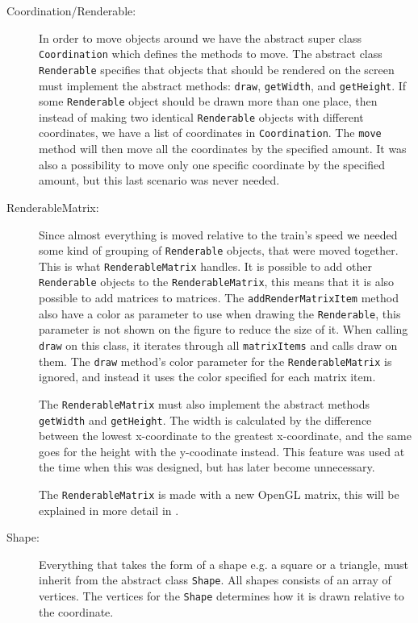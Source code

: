 \begin{description}
\item[Coordination/Renderable:] In order to move objects around we have the abstract super class \lstinline|Coordination| which defines the methods to move. The abstract class \lstinline|Renderable| specifies that objects that should be rendered on the screen must implement the abstract methods: \lstinline|draw|, \lstinline|getWidth|, and \lstinline|getHeight|. If some \lstinline|Renderable| object should be drawn more than one place, then instead of making two identical \lstinline|Renderable| objects with different coordinates, we have a list of coordinates in \lstinline|Coordination|. The \lstinline|move| method will then move all the coordinates by the specified amount. It was also a possibility to move only one specific coordinate by the specified amount, but this last scenario was never needed.

\item[RenderableMatrix:] Since almost everything is moved relative to the train's speed we needed some kind of grouping of \lstinline|Renderable| objects, that were moved together. This is what \lstinline|RenderableMatrix| handles. It is possible to add other \lstinline|Renderable| objects to the \lstinline|RenderableMatrix|, this means that it is also possible to add matrices to matrices. The \lstinline|addRenderMatrixItem| method also have a color as parameter to use when drawing the \lstinline|Renderable|, this parameter is not shown on the figure to reduce the size of it. When calling \lstinline|draw| on this class, it iterates through all \lstinline|matrixItems| and calls draw on them. The \lstinline|draw| method's color parameter for the \lstinline|RenderableMatrix| is ignored, and instead it uses the color specified for each matrix item.

The \lstinline|RenderableMatrix| must also implement the abstract methods \lstinline|getWidth| and \lstinline|getHeight|. The width is calculated by the difference between the lowest x-coordinate to the greatest x-coordinate, and the same goes for the height with the y-coodinate instead. This feature was used at the time when this was designed, but has later become unnecessary.

The \lstinline|RenderableMatrix| is made with a new OpenGL matrix, this will be explained in more detail in .

\item[Shape:] Everything that takes the form of a shape e.g. a square or a triangle, must inherit from the abstract class \lstinline|Shape|. All shapes consists of an array of vertices. The vertices for the \lstinline|Shape| determines how it is drawn relative to the coordinate.


\end{description}
